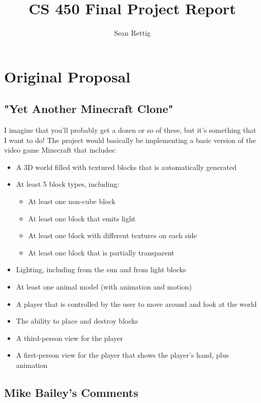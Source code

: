 \documentclass[12pt]{article}
\title{CS 450 Final Project Report}
\author{Sean Rettig}
\begin{document}
 

\maketitle

\section{Original Proposal}

\subsection{"Yet Another Minecraft Clone"}

I imagine that you'll probably get a dozen or so of these, but it's something that I want to do!
The project would basically be implementing a basic version of the video game Minecraft that includes:
\begin{itemize}
    \item A 3D world filled with textured blocks that is automatically generated
\item At least 5 block types, including:
    \begin{itemize}
        \item At least one non-cube block
        \item At least one block that emits light
        \item At least one block with different textures on each side
        \item At least one block that is partially transparent
    \end{itemize}
    \item Lighting, including from the sun and from light blocks
    \item At least one animal model (with animation and motion)
    \item A player that is controlled by the user to move around and look at the world
    \item The ability to place and destroy blocks
    \item A third-person view for the player
    \item A first-person view for the player that shows the player's hand, plus animation
\end{itemize}

\subsection{Mike Bailey's Comments}
\end{document}
